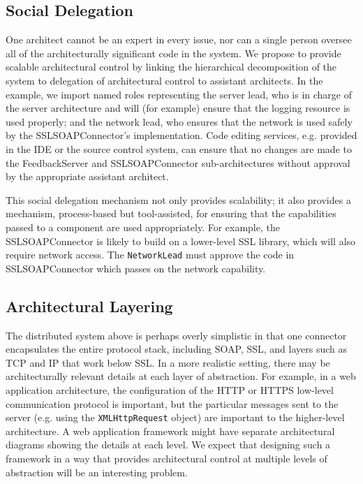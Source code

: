 \documentclass[runningheads]{llncs}
\begin{document}
\begin{sloppypar}
\subsection{Social Delegation}

One architect cannot be an expert in every issue, nor can a single person oversee all of the architecturally significant code in the system.  We propose to provide scalable architectural control by linking the hierarchical decomposition of the system to delegation of architectural control to assistant architects.  In the example, we import named roles representing the server lead, who is in charge of the server architecture and will (for example) ensure that the logging resource is used properly; and the network lead, who ensures that the network is used safely by the SSLSOAPConnector's implementation.  Code editing services, e.g. provided in the IDE or the source control system, can ensure that no changes are made to the FeedbackServer and SSLSOAPConnector sub-architectures without approval by the appropriate assistant architect.

This social delegation mechanism not only provides scalability; it also provides a mechanism, process-based but tool-assisted, for ensuring that the capabilities passed to a component are used appropriately.  For example, the SSLSOAPConnector is likely to build on a lower-level SSL library, which will also require network access.  The \texttt{NetworkLead} must approve the code in SSLSOAPConnector which passes on the network capability.


\subsection{Architectural Layering}

The distributed system above is perhaps overly simplistic in that one connector encapsulates the entire protocol stack, including SOAP, SSL, and layers such as TCP and IP that work below SSL.  In a more realistic setting, there may be architecturally relevant details at each layer of abstraction.  For example, in a web application architecture, the configuration of the HTTP or HTTPS low-level communication protocol is important, but the particular messages sent to the server (e.g. using the \texttt{XMLHttpRequest} object) are important to the higher-level architecture.  A web application framework might have separate architectural diagrams showing the details at each level.  We expect that designing such a framework in a way that provides architectural control at multiple levels of abstraction will be an interesting problem.




\end{sloppypar}
\end{document}
